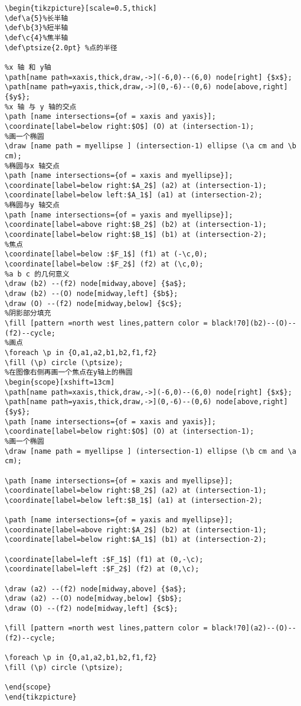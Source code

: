 \begin{lstlisting}
\begin{tikzpicture}[scale=0.5,thick]
\def\a{5}%长半轴
\def\b{3}%短半轴
\def\c{4}%焦半轴
\def\ptsize{2.0pt} %点的半径

%x 轴 和 y轴 
\path[name path=xaxis,thick,draw,->](-6,0)--(6,0) node[right] {$x$};
\path[name path=yaxis,thick,draw,->](0,-6)--(0,6) node[above,right] {$y$};
%x 轴 与 y 轴的交点 
\path [name intersections={of = xaxis and yaxis}];
\coordinate[label=below right:$O$] (O) at (intersection-1);
%画一个椭圆
\draw [name path = myellipse ] (intersection-1) ellipse (\a cm and \b cm);
%椭圆与x 轴交点
\path [name intersections={of = xaxis and myellipse}];
\coordinate[label=below right:$A_2$] (a2) at (intersection-1);
\coordinate[label=below left:$A_1$] (a1) at (intersection-2);
%椭圆与y 轴交点
\path [name intersections={of = yaxis and myellipse}];
\coordinate[label=above right:$B_2$] (b2) at (intersection-1);
\coordinate[label=below right:$B_1$] (b1) at (intersection-2);
%焦点
\coordinate[label=below :$F_1$] (f1) at (-\c,0);
\coordinate[label=below :$F_2$] (f2) at (\c,0);
%a b c 的几何意义
\draw (b2) --(f2) node[midway,above] {$a$};
\draw (b2) --(O) node[midway,left] {$b$};
\draw (O) --(f2) node[midway,below] {$c$};
%阴影部分填充
\fill [pattern =north west lines,pattern color = black!70](b2)--(O)--(f2)--cycle;
%画点
\foreach \p in {O,a1,a2,b1,b2,f1,f2}
\fill (\p) circle (\ptsize);
%在图像右侧再画一个焦点在y轴上的椭圆
\begin{scope}[xshift=13cm]
\path[name path=xaxis,thick,draw,->](-6,0)--(6,0) node[right] {$x$};
\path[name path=yaxis,thick,draw,->](0,-6)--(0,6) node[above,right] {$y$};
\path [name intersections={of = xaxis and yaxis}];
\coordinate[label=below right:$O$] (O) at (intersection-1);
%画一个椭圆
\draw [name path = myellipse ] (intersection-1) ellipse (\b cm and \a cm);

\path [name intersections={of = xaxis and myellipse}];
\coordinate[label=below right:$B_2$] (a2) at (intersection-1);
\coordinate[label=below left:$B_1$] (a1) at (intersection-2);

\path [name intersections={of = yaxis and myellipse}];
\coordinate[label=above right:$A_2$] (b2) at (intersection-1);
\coordinate[label=below right:$A_1$] (b1) at (intersection-2);

\coordinate[label=left :$F_1$] (f1) at (0,-\c);
\coordinate[label=left :$F_2$] (f2) at (0,\c);

\draw (a2) --(f2) node[midway,above] {$a$};
\draw (a2) --(O) node[midway,below] {$b$};
\draw (O) --(f2) node[midway,left] {$c$};

\fill [pattern =north west lines,pattern color = black!70](a2)--(O)--(f2)--cycle;

\foreach \p in {O,a1,a2,b1,b2,f1,f2}
\fill (\p) circle (\ptsize);

\end{scope}
\end{tikzpicture}
\end{lstlisting}
